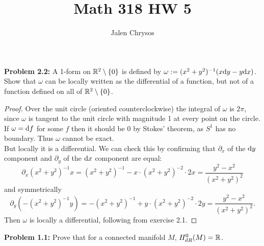 \documentclass{amsart}
\title{Math 318 HW 5}
\author{Jalen Chrysos}
\begin{document}
	\maketitle
	
	\textbf{Problem 2.2:} A 1-form on $\mathbb{R}^2\setminus \{0\}$ is defined by $\omega := (x^2+y^2)^{-1}(x\textrm{d} y - y \textrm{d} x)$. Show that $\omega$ can be locally written as the differential of a function, but not of a function defined on all of $\mathbb{R}^2\setminus \{0\}$.
	
	\begin{proof}
%		

Over the unit circle (oriented counterclockwise) the integral of $\omega$ is $2\pi$, since $\omega$ is tangent to the unit circle with magnitude 1 at every point on the circle. If $\omega=\textrm{d} f$ for some $f$ then it should be 0 by Stokes' theorem, as $S^1$ has no boundary. Thus $\omega$ cannot be exact.\\

But locally it is a differential. We can check this by confirming that $\partial_x$ of the $\textrm{d} y$ component and $\partial_y$ of the $\textrm{d} x$ component are equal:
$$
\partial_x (x^2+y^2)^{-1}x = (x^2+y^2)^{-1} - x\cdot (x^2+y^2)^{-2}\cdot 2x = \frac{y^2-x^2}{(x^2+y^2)^2}
$$
and symmetrically 
$$
\partial_y (-(x^2+y^2)^{-1}y) = -(x^2+y^2)^{-1} + y\cdot (x^2+y^2)^{-2}\cdot 2y = \frac{y^2-x^2}{(x^2+y^2)^2}.
$$
Then $\omega$ is locally a differential, following from exercise 2.1.
\end{proof}
	
	\newpage 
	
	\textbf{Problem 1.1:} Prove that for a connected manifold $M$, $H^0_{dR}(M)=\mathbb{R}$.
	
\end{document}
